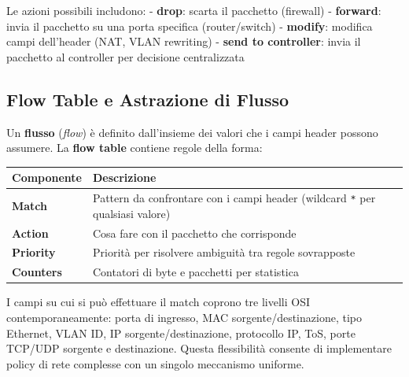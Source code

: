 \documentclass[
  italian,
  openany]{book}
\newcounter{none} %
\begin{document}
Le azioni possibili includono: - \textbf{drop}: scarta il pacchetto
(firewall) - \textbf{forward}: invia il pacchetto su una porta specifica
(router/switch) - \textbf{modify}: modifica campi dell'header (NAT, VLAN
rewriting) - \textbf{send to controller}: invia il pacchetto al
controller per decisione centralizzata

\subsection{Flow Table e Astrazione di
Flusso}\label{flow-table-e-astrazione-di-flusso}

Un \textbf{flusso} (\emph{flow}) è definito dall'insieme dei valori che
i campi header possono assumere. La \textbf{flow table} contiene regole
della forma:

{\def\LTcaptype{none} %
\begin{longtable}[]{@{}
  >{\raggedright\arraybackslash}p{}
  >{\raggedright\arraybackslash}p{}@{}}
\toprule\noalign{}
\begin{minipage}[b]{\linewidth}\raggedright
Componente
\end{minipage} & \begin{minipage}[b]{\linewidth}\raggedright
Descrizione
\end{minipage} \\
\midrule\noalign{}
\endhead
\bottomrule\noalign{}
\endlastfoot
\textbf{Match} & Pattern da confrontare con i campi header (wildcard
\texttt{*} per qualsiasi valore) \\
\textbf{Action} & Cosa fare con il pacchetto che corrisponde \\
\textbf{Priority} & Priorità per risolvere ambiguità tra regole
sovrapposte \\
\textbf{Counters} & Contatori di byte e pacchetti per statistica \\
\end{longtable}
}

I campi su cui si può effettuare il match coprono tre livelli OSI
contemporaneamente: porta di ingresso, MAC sorgente/destinazione, tipo
Ethernet, VLAN ID, IP sorgente/destinazione, protocollo IP, ToS, porte
TCP/UDP sorgente e destinazione. Questa flessibilità consente di
implementare policy di rete complesse con un singolo meccanismo
uniforme.
\end{document}
